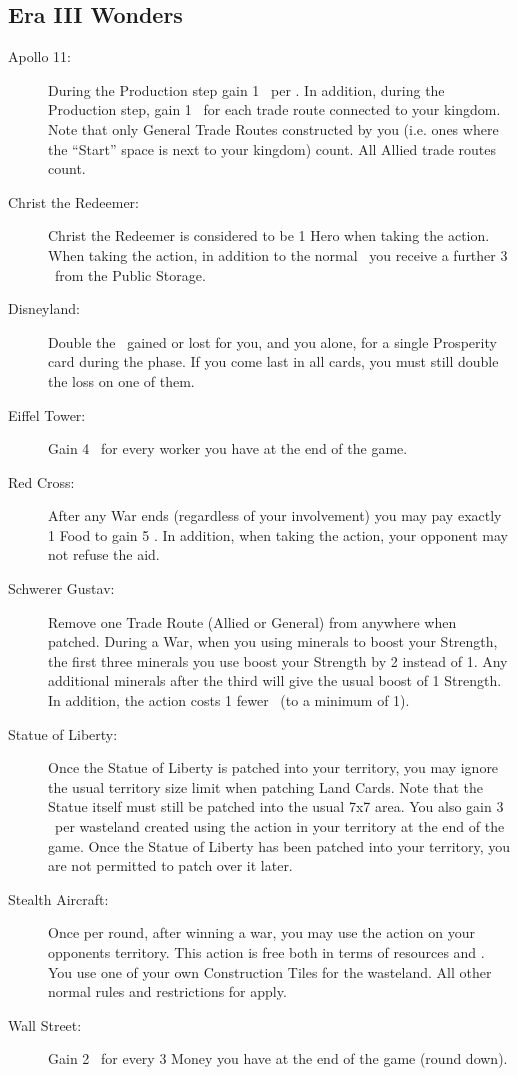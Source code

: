 \documentclass[10pt,twocolumn]{article}
\begin{document}
\begin{appendices}
\subsection{Era III Wonders}
\begin{description}
\item[Apollo 11:] During the Production step gain 1 \vp\ per \tra. In addition, during the Production step, gain 1 \vp\ for each trade route connected to your kingdom. Note that only General Trade Routes constructed by you (i.e. ones where the ``Start'' space is next to your kingdom) count. All Allied trade routes count.
\item[Christ the Redeemer:] Christ the Redeemer is considered to be 1 Hero when taking the  action. When taking the  action, in addition to the normal \vps\ you receive a further 3 \vps\ from the Public Storage.
\item[Disneyland:] Double the \vps\ gained or lost for you, and you alone, for a single Prosperity card during the  phase. If you come last in all cards, you must still double the loss on one of them.
\item[Eiffel Tower:] Gain 4 \vps\ for every worker you have at the end of the game.
\item[Red Cross:] After any War ends (regardless of your involvement) you may pay exactly 1 Food to gain 5 \vps. In addition, when taking the  action, your opponent may not refuse the aid.
\item[Schwerer Gustav:] Remove one Trade Route (Allied or General) from anywhere when patched. During a War, when you using minerals to boost your Strength, the first three minerals you use boost your Strength by 2 instead of 1. Any additional minerals after the third will give the usual boost of 1 Strength. In addition, the  action costs 1 fewer \polf\ (to a minimum of 1).
\item[Statue of Liberty:] Once the Statue of Liberty is patched into your territory, you may ignore the usual territory size limit when patching Land Cards. Note that the Statue itself must still be patched into the usual 7x7 area. You also gain 3 \vps\ per wasteland created using the  action in your territory at the end of the game. Once the Statue of Liberty has been patched into your territory, you are not permitted to patch over it later.
\item[Stealth Aircraft:] Once per round, after winning a war, you may use the  action on your opponents territory. This action is free both in terms of resources and \polf. You use one of your own Construction Tiles for the wasteland. All other normal rules and restrictions for  apply.
\item[Wall Street:] Gain 2 \vps\ for every 3 Money you have at the end of the game (round down).
\end{description}

\end{appendices}
\end{document}

